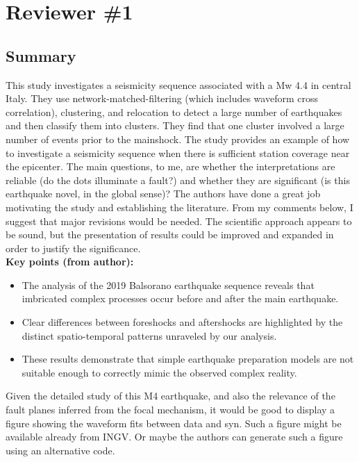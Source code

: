 \documentclass[10pt]{extarticle}
\begin{document}
\section*{Reviewer \#1}


\subsection*{Summary}

This study investigates a seismicity sequence associated with a Mw 4.4 in central Italy. They use network-matched-filtering (which includes waveform cross correlation), clustering, and relocation to detect a large number of earthquakes and then classify them into clusters. They find that one cluster involved a large number of events prior to the mainshock. The study provides an example of how to investigate a seismicity sequence when there is sufficient station coverage near the epicenter. The main questions, to me, are whether the interpretations are reliable (do the dots illuminate a fault?) and whether they are significant (is this earthquake novel, in the global sense)? The authors have done a great job motivating the study and establishing the literature. From my comments below, I suggest that major revisions would be needed. The scientific approach appears to be sound, but the presentation of results could be improved and expanded in order to justify the significance. \\

{\bf Key points (from author):} \\
\begin{itemize}
 \item[1] The analysis of the 2019 Balsorano earthquake sequence reveals that imbricated complex processes occur before and after the main earthquake. 
 \item[2] Clear differences between foreshocks and aftershocks are highlighted by the distinct spatio-temporal patterns unraveled by our analysis.
 \item[3] These results demonstrate that simple earthquake preparation models are not suitable enough to correctly mimic the observed complex reality.
\end{itemize}



\begin{ReviewerComment}{1}
\noindent 
Given the detailed study of this M4 earthquake, and also the relevance of the fault planes inferred from the focal mechanism, it would be good to display a figure showing the waveform fits between data and syn. Such a figure might be available already from INGV. Or maybe the authors can generate such a figure using an alternative code.
\end{ReviewerComment}
\end{document}
